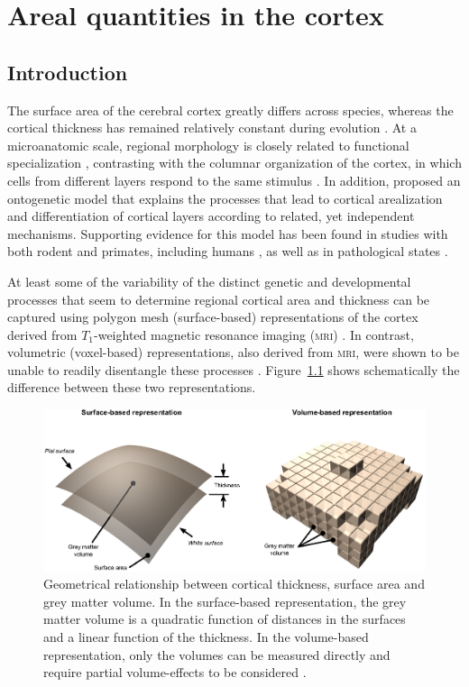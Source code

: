 \chapter{Areal quantities in the cortex}
\label{sec:areal}
\setstretch{\lspac}

\section{Introduction}

The surface area of the cerebral cortex greatly differs across species, whereas the cortical thickness has remained relatively constant during evolution \citep{Mountcastle1998, Fish2008}. At a microanatomic scale, regional morphology is closely related to functional specialization \citep{Roland1998, Zilles2010}, contrasting with the columnar organization of the cortex, in which cells from different layers respond to the same stimulus \citep{EGJones2000, Buxhoeveden2002}. In addition, \citet{Rakic1988} proposed an ontogenetic model that explains the processes that lead to cortical arealization and differentiation of cortical layers according to related, yet independent mechanisms. Supporting evidence for this model has been found in studies with both rodent and primates, including humans \citep{Chenn2002, Rakic2009}, as well as in pathological states \citep{Rimol2010b, Bilguvar2010}.

At least some of the variability of the distinct genetic and developmental processes that seem to determine regional cortical area and thickness can be captured using polygon mesh (surface-based) representations of the cortex derived from $T_1$-weighted magnetic resonance imaging (\textsc{mri}) \citep{Panizzon2009, Winkler2010, SanabriaDiaz2010}. In contrast, volumetric (voxel-based) representations, also derived from \textsc{mri}, were shown to be unable to readily disentangle these processes \citep{Winkler2010}. Figure~\ref{fig:areal:geometry} shows schematically the difference between these two representations.

\begin{figure}[!tp]
\centering
\includegraphics[width=14cm]{images/geometry.eps}
\caption[Surface- and volume-based representations of the cortex.]{Geometrical relationship between cortical thickness, surface area and grey matter volume. In the surface-based representation, the grey matter volume is a quadratic function of distances in the surfaces and a linear function of the thickness. In the volume-based representation, only the volumes can be measured directly and require partial volume-effects to be considered \citep{Winkler2010}.}
\label{fig:areal:geometry}
\end{figure}

